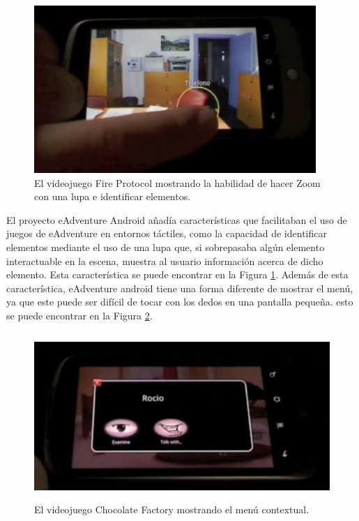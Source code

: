 \begin{figure}[htb]
	\centerline{\includegraphics[height=2.5in]{figures/eandroid.png}}
	\caption[eAdventure Android - Lupa]{El videojuego Fire Protocol mostrando la habilidad de hacer Zoom con una lupa e identificar elementos.}
	\label{eandroidlupa}
\end{figure}

El proyecto eAdventure Android añadía características que facilitaban el uso de juegos de eAdventure en entornos táctiles, como la capacidad de identificar elementos mediante el uso de una lupa que, si sobrepasaba algún elemento interactuable en la escena, muestra al usuario información acerca de dicho elemento. Esta característica se puede encontrar en la Figura \ref{eandroidlupa}. Además de esta característica, eAdventure android tiene una forma diferente de mostrar el menú, ya que este puede ser difícil de tocar con los dedos en una pantalla pequeña. esto se puede encontrar en la Figura \ref{eandroidmenu}.

\begin{figure}[htb]
	\centerline{\includegraphics[height=2.5in]{figures/eandroid-menu.png}}
	\caption[eAdventure Android - Menu]{El videojuego Chocolate Factory mostrando el menú contextual.}
	\label{eandroidmenu}
\end{figure}


